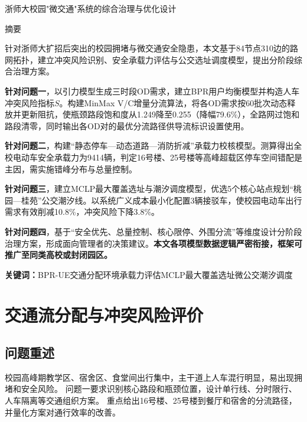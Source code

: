 \documentclass[UTF8,zihao=-4,a4paper]{ctexart}
\numberwithin{table}{section}
\numberwithin{figure}{section}
\numberwithin{equation}{section}
\begin{document}
\begin{center}
{\heiti{} 浙师大校园"微交通"系统的综合治理与优化设计}
\end{center}

\begin{center}
{\heiti{} 摘\quad 要}
\end{center}

\begingroup
\begin{spacing}{1.8}
针对浙师大扩招后突出的校园拥堵与微交通安全隐患，本文基于84节点310边的路网拓扑，建立冲突风险识别、安全承载力评估与公交选址调度模型，提出分阶段综合治理方案。

\textbf{针对问题一}，以引力模型生成三时段OD需求，建立BPR用户均衡模型并构造人车冲突风险指标$S$。构建MinMax V/C增量分流算法，将各OD需求按60批次动态释放并更新阻抗，使瓶颈路段饱和度从1.249降至0.255（降幅79.6\%），全路网过饱和路段清零，同时输出各OD对的最优分流路径供导流标识设置使用。

\textbf{针对问题二}，构建“静态停车—动态道路—消防折减”承载力校核模型。测算得出全校电动车安全承载力为9414辆，判定16号楼、25号楼等高峰超载区停车空间错配是主因，需实施错峰分布与总量控制。

\textbf{针对问题三}，建立MCLP最大覆盖选址与潮汐调度模型，优选5个核心站点规划“桃园—桂苑”公交潮汐线。以系统广义成本最小化配置3辆接驳车，使校园电动车出行需求有效削减10.8\%，冲突风险下降3.8\%。

\textbf{针对问题四}，基于“安全优先、总量控制、核心限停、外围分流”等维度设计分阶段治理方案，形成面向管理者的决策建议。\textbf{本文各项模型数据逻辑严密衔接，框架可推广至同类高校或封闭园区。}
\end{spacing}
\endgroup

\vspace{0.5em}
\noindent\textbf{关键词：}BPR-UE交通分配\quad 环境承载力评估\quad MCLP最大覆盖选址\quad 微公交潮汐调度
\newpage

\section{交通流分配与冲突风险评价}

\subsection{问题重述}

校园高峰期教学区、宿舍区、食堂间出行集中，主干道上人车混行明显，易出现拥堵和安全风险。
问题一要求识别核心路段和瓶颈位置，设计单行线、分时限行、人车隔离等交通组织方案。
重点给出16号楼、25号楼到餐厅和宿舍的分流路径，并量化方案对通行效率的改善。
\end{document}
